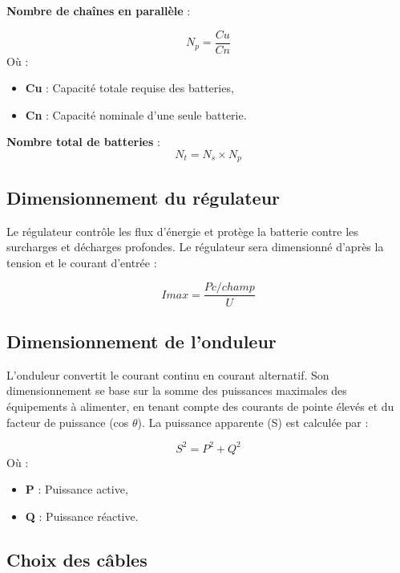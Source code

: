 \textbf{Nombre de chaînes en parallèle} : 

	\begin{equation}
N_p = \frac{Cu}{Cn}
\end{equation}
Où :
	\begin{itemize}
	\item \textbf{Cu} : Capacité totale requise des batteries,
	\item \textbf{Cn} : Capacité nominale d'une seule batterie.
\end{itemize}

\textbf{Nombre total de batteries} :
	\begin{equation}
N_t = N_s \times N_p 
\end{equation}




\subsection{Dimensionnement du régulateur}

Le régulateur contrôle les flux d’énergie et protège la batterie contre les surcharges et décharges profondes. Le régulateur sera dimensionné d’après la tension et le courant d’entrée :

\begin{equation}
Imax = \frac{Pc/champ}{U}
\end{equation}
\subsection{Dimensionnement de l’onduleur}
L'onduleur convertit le courant continu en courant alternatif. Son dimensionnement se base sur la somme des puissances maximales des équipements à alimenter, en tenant compte des courants de pointe élevés et du facteur de puissance (cos \(\theta\)). La puissance apparente (S) est calculée par :

	\begin{equation}
S^2 = P^2 + Q^2
\end{equation}
Où :
	\begin{itemize}
	\item \textbf{P} : Puissance active,
	\item \textbf{Q} : Puissance réactive.
\end{itemize}

\subsection{Choix des câbles}


